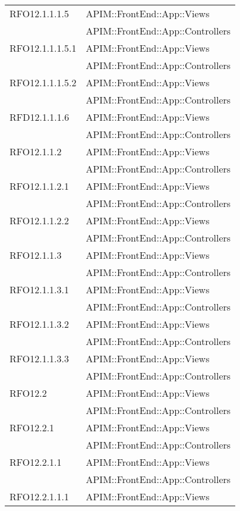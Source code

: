 \begin{longtable}{ p{4cm} | p{12cm} }
			RFO12.1.1.1.5
			& APIM::FrontEnd::App::Views \\
			& APIM::FrontEnd::App::Controllers \\
			\hline	
			RFO12.1.1.1.5.1
			& APIM::FrontEnd::App::Views \\
			& APIM::FrontEnd::App::Controllers \\
			\hline	
			RFO12.1.1.1.5.2
			& APIM::FrontEnd::App::Views \\
			& APIM::FrontEnd::App::Controllers \\
			\hline	
			RFD12.1.1.1.6
			& APIM::FrontEnd::App::Views \\
			& APIM::FrontEnd::App::Controllers \\
			\hline	
			RFO12.1.1.2
			& APIM::FrontEnd::App::Views \\
			& APIM::FrontEnd::App::Controllers \\
			\hline	
			RFO12.1.1.2.1
			& APIM::FrontEnd::App::Views \\
			& APIM::FrontEnd::App::Controllers \\
			\hline	
			RFO12.1.1.2.2
			& APIM::FrontEnd::App::Views \\
			& APIM::FrontEnd::App::Controllers \\
			\hline	
			RFO12.1.1.3
			& APIM::FrontEnd::App::Views \\
			& APIM::FrontEnd::App::Controllers \\
			\hline	
			RFO12.1.1.3.1
			& APIM::FrontEnd::App::Views \\
			& APIM::FrontEnd::App::Controllers \\
			\hline	
			RFO12.1.1.3.2
			& APIM::FrontEnd::App::Views \\
			& APIM::FrontEnd::App::Controllers \\
			\hline	
			RFO12.1.1.3.3
			& APIM::FrontEnd::App::Views \\
			& APIM::FrontEnd::App::Controllers \\
			\hline
			RFO12.2	
			& APIM::FrontEnd::App::Views \\
			& APIM::FrontEnd::App::Controllers \\
			\hline
			RFO12.2.1	
			& APIM::FrontEnd::App::Views \\
			& APIM::FrontEnd::App::Controllers \\
			\hline
			RFO12.2.1.1	
			& APIM::FrontEnd::App::Views \\
			& APIM::FrontEnd::App::Controllers \\
			\hline
			RFO12.2.1.1.1
			& APIM::FrontEnd::App::Views \\

\end{longtable}

